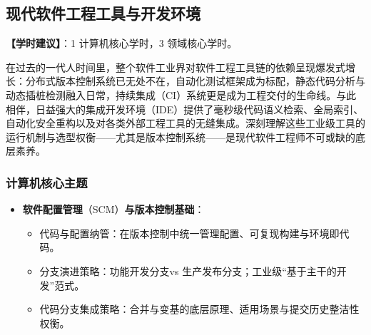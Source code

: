\subsection{现代软件工程工具与开发环境}
\textbf{【学时建议】}：1 计算机核心学时，3 领域核心学时。

在过去的一代人时间里，整个软件工业界对软件工程工具链的依赖呈现爆发式增长：分布式版本控制系统已无处不在，自动化测试框架成为标配，静态代码分析与动态插桩检测融入日常，持续集成（CI）系统更是成为工程交付的生命线。与此相伴，日益强大的集成开发环境（IDE）提供了毫秒级代码语义检索、全局索引、自动化安全重构以及对各类外部工程工具的无缝集成。深刻理解这些工业级工具的运行机制与选型权衡——尤其是版本控制系统——是现代软件工程师不可或缺的底层素养。

\subsubsection{计算机核心主题}
\begin{itemize}
    \item \textbf{软件配置管理}（SCM）\textbf{与版本控制基础}：
    \begin{itemize}
        \item 代码与配置纳管：在版本控制中统一管理配置、可复现构建与环境即代码。
        \item 分支演进策略：功能开发分支vs 生产发布分支；工业级“基于主干的开发”范式。
        \item 代码分支集成策略：合并与变基的底层原理、适用场景与提交历史整洁性权衡。
    \end{itemize}
\end{itemize}

